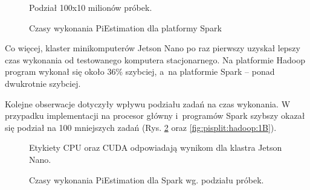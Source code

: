 \begin{figure}[h!]
    \centering
    \caption{Czasy wykonania PiEstimation dla platformy Spark}
    \medskip \small
    Podział 100x10 milionów próbek.
    \label{fig:piestimation:spark:1B}
\end{figure}
\newpage

Co więcej, klaster minikomputerów Jetson Nano po raz pierwszy uzyskał lepszy czas wykonania od testowanego
komputera stacjonarnego. Na platformie Hadoop program wykonał się około 36\% szybciej, a~na platformie
Spark -- ponad dwukrotnie szybciej.

Kolejne obserwacje dotyczyły wpływu podziału zadań na czas wykonania. W przypadku implementacji
na procesor główny i~programów Spark szybszy okazał się podział na 100 mniejszych zadań
(Rys. \ref{fig:pisplit:spark:1B} oraz \ref{fig:pisplit:hadoop:1B}).

\begin{figure}[h!]
    \centering
    \caption{Czasy wykonania PiEstimation dla Spark wg. podziału próbek.}
    \medskip \small
    Etykiety CPU oraz CUDA odpowiadają wynikom dla klastra Jetson Nano.
    \label{fig:pisplit:spark:1B}
\end{figure}
\newpage

